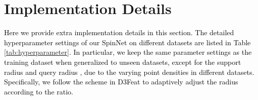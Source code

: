 \documentclass[final]{cvpr}
\newcommand{\nickname}{SpinNet}
\newcommand{\qysupp}[1]{\textcolor{black}{#1}}
\begin{document}
\section{Implementation Details}
\qysupp{Here we provide extra implementation details in this section. The detailed hyperparameter settings of our \nickname{} on different datasets are listed in Table \ref{tab:hyperparameter}. In particular, we keep the same parameter settings as the training dataset when generalized to unseen datasets, except for the support radius  and query radius , due to the varying point densities in different datasets. Specifically, we follow the scheme in D3Feat \cite{bai2020d3feat} to adaptively adjust the radius according to the ratio.
}
\begin{table}[thb]
\begin{center}
\end{center}
\caption{The hyperparameters set by our method in different datasets.}
\label{tab:hyperparameter}
\end{table}
\end{document}

